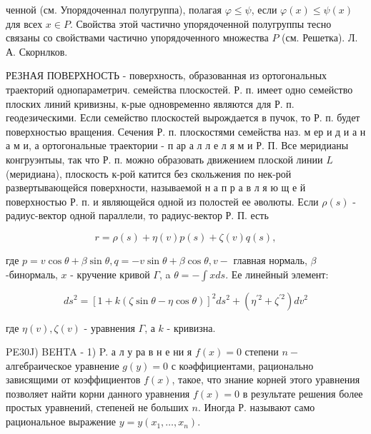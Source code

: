\documentclass[10pt]{article}
\begin{document}
ченной (см. Упорядоченнал полугруппа), полагая $\varphi \leqslant \psi$, если $\varphi(x) \leqslant \psi(x)$ для всех $x \in P$. Свойства этой частично упорядоченной полугруппы тесно связаны со свойствами частично упорядоченного множества $P$ (см. Решетка). Л. А. Скорнлков.



РЕЗНАЯ ПОВЕРХНОСТЬ - поверхность, образованная из ортогональных траекторий однопараметрич. семейства плоскостей. Р. п. имеет одно семейство плоских линий кривизны, к-рые одновременно являются для Р. п. геодезическими. Если семейство плоскостей вырождается в пучок, то Р. п. будет поверхностью вращения. Сечения Р. п. плоскостями семейства наз. м ер и д и а н а м и, а ортогональные траектории - п ар а л л е л я м и Р. П. Все меридианы конгруэнтыы, так что Р. п. можно образовать движением плоской линии $L$ (меридиана), плоскость к-рой катится без скольжения по нек-рой развертывающейся поверхности, называемой н а п р а в л я ю щ е й поверхностью Р. п. и являющейся одной из полостей ее әволюты. Если $\rho(s)$ - радиус-вектор одной параллели, то радиус-вектор Р. П. есть



\[

r=\rho(s)+\eta(v) p(s)+\zeta(v) q(s),

\]



где $p=v \cos \theta+\beta \sin \theta, q=-v \sin \theta+\beta \cos \theta, v-$ главная нормаль, $\beta$-бинормаль, $x$ - кручение кривой $\Gamma$, a $\theta=-\int x d s$. Ее линейный элемент:



\[

d s^{2}=[1+k(\zeta \sin \theta-\eta \cos \theta)]^{2} d s^{2}+\left(\eta^{\prime 2}+\zeta^{\prime 2}\right) d v^{2}

\]



где $\eta(v), \zeta(v)$ - уравнения $\Gamma$, а $k$ - кривизна.



PE30J) BEHTA - 1) P. а л у ра в н е ни я $f(x)=0$ степени $n-$ алгебраическое уравнение $g(y)=0$ с коәффициентами, рационально зависящими от коэффициентов $f(x)$, такое, что знание корней этого уравнения позволяет найти корни данного уравнения $f(x)=0$ в результате решения более простых уравнений, степеней не больших $n$. Иногда Р. называют само рациональное выражение $y=y\left(x_{1}, \ldots, x_{n}\right)$.
\end{document}

